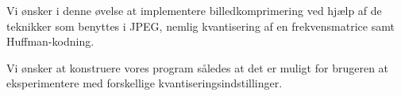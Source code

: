 Vi ønsker i denne øvelse at implementere billedkomprimering ved hjælp af de teknikker som benyttes i JPEG, nemlig kvantisering af en frekvensmatrice samt Huffman-kodning.

Vi ønsker at konstruere vores program således at det er muligt for brugeren at eksperimentere med forskellige kvantiseringsindstillinger.

